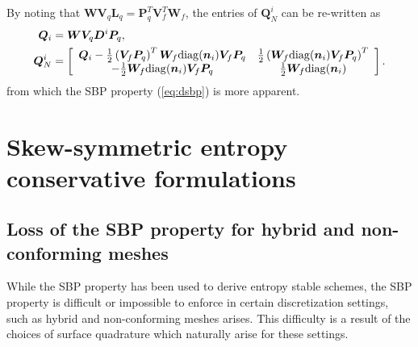 \documentclass[review]{siamart0216}
\theoremstyle{assumption}
\renewcommand{\hat}[1]{\widehat{#1}}
\newcommand{\LRp}[1]{\left( #1 \right)}
\newcommand{\LRs}[1]{\left[ #1 \right]}
\newcommand{\diag}[1]{{\rm diag}\LRp{#1}}
\begin{document}
By noting that $\bm{W}\bm{V}_q \bm{L}_q = \bm{P}_q^T\bm{V}_f^T\bm{W}_f$, the entries of $\bm{Q}^i_N$ can be re-written as
\begin{align}
\bm{Q}_i &= \bm{W}\bm{V}_q\bm{D}^i\bm{P}_q,\\
\bm{Q}^i_N  &= \LRs{
\begin{array}{cc}
\bm{Q}_i - \frac{1}{2}\LRp{\bm{V}_f \bm{P}_q}^T  \bm{W}_f{\rm diag}({\bm{n}}_i) \bm{V}_f\bm{P}_q &  \frac{1}{2}\LRp{\bm{W}_f{\rm diag}({\bm{n}}_i)\bm{V}_f\bm{P}_q}^T\\
-\frac{1}{2}\bm{W}_f{\rm diag}({\bm{n}}_i)\bm{V}_f\bm{P}_q & \frac{1}{2}\bm{W}_f{\rm diag}({\bm{n}}_i)
\end{array}}.
\label{eq:QN}
\end{align}
from which the SBP property (\ref{eq:dsbp}) is more apparent.  



\section{Skew-symmetric entropy conservative formulations}

\subsection{Loss of the SBP property for hybrid and non-conforming meshes}

While the SBP property has been used to derive entropy stable schemes, the SBP property is difficult or impossible to enforce in certain discretization settings, such as hybrid and non-conforming meshes arises.  This difficulty is a result of the choices of surface quadrature which naturally arise for these settings.  
\end{document}
